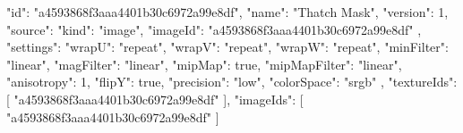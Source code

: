 {
  "id": "a4593868f3aaa4401b30c6972a99e8df",
  "name": "Thatch Mask",
  "version": 1,
  "source": {
    "kind": "image",
    "imageId": "a4593868f3aaa4401b30c6972a99e8df"
  },
  "settings": {
    "wrapU": "repeat",
    "wrapV": "repeat",
    "wrapW": "repeat",
    "minFilter": "linear",
    "magFilter": "linear",
    "mipMap": true,
    "mipMapFilter": "linear",
    "anisotropy": 1,
    "flipY": true,
    "precision": "low",
    "colorSpace": "srgb"
  },
  "textureIds": [
    "a4593868f3aaa4401b30c6972a99e8df"
  ],
  "imageIds": [
    "a4593868f3aaa4401b30c6972a99e8df"
  ]
}
